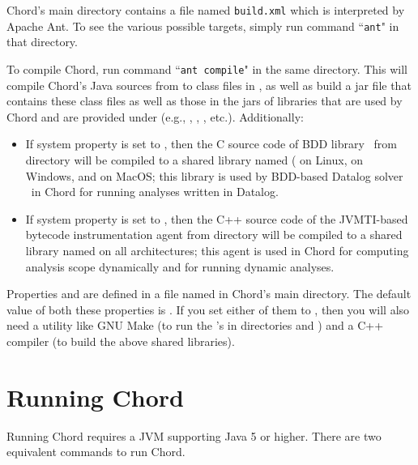 Chord's main directory contains a file named {\tt build.xml} which is
interpreted by Apache Ant.  To see the various possible targets, simply run
command ``{\tt ant}" in that directory.

To compile Chord, run command ``{\tt ant compile}" in the same directory.  This
will compile Chord's Java sources from  to class files in
, as well as build a jar file  that contains
these class files as well as those in the jars of libraries that are used by
Chord and are provided under  (e.g., ,
, , etc.).  Additionally:

\begin{itemize}
\item

If system property  is set to , then the C
source code of BDD library \buddy\ from directory  will be compiled
to a shared library named ( on Linux,  on
Windows, and  on MacOS; this library is used by BDD-based
Datalog solver \bddbddb\ in Chord for running analyses written in Datalog.

\item

If system property  is set to , then the C++
source code of the JVMTI-based bytecode instrumentation agent from directory
 will be compiled to a shared library named
 on all architectures; this agent is used in Chord
for computing analysis scope dynamically and for running dynamic analyses.
\end{itemize}

Properties  and  are defined in a
file named  in Chord's main directory.  The default value
of both these properties is .  If you set either of them to
, then you will also need a utility like GNU Make (to run the
's in directories  and ) and a C++
compiler (to build the above shared libraries).

\section{Running Chord}
\label{sec:running-chord}

Running Chord requires a JVM supporting Java 5 or higher.  There are two
equivalent commands to run Chord.

